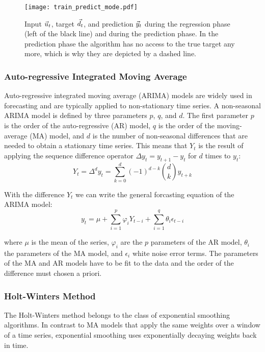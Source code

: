 \begin{figure}
  \centering
  \texttt{[image: train\_predict\_mode.pdf]}
  \caption{Input $\vec{u}_t$, target $\vec{d}_t$, and prediction $\vec{y}_t$ during the
  regression phase (left of the black line) and during the prediction phase.
  In the prediction phase the algorithm has no access to the true target
  any more, which is why they are depicted by a dashed line.}
  \label{fig:train_predict_mode}
\end{figure}

\subsubsection{Auto-regressive Integrated Moving Average}
\label{sub:arma}

Auto-regressive integrated moving average (ARIMA) models are widely used in
forecasting and are typically applied to non-stationary time series.  A
non-seasonal ARIMA model is defined by three parameters $p$, $q$, and $d$.  The
first parameter $p$ is the order of the auto-regressive (AR) model, $q$ is the
order of the moving-average (MA) model, and $d$ is the number of non-seasonal
differences that are needed to obtain a stationary time series.  This means
that $Y_t$ is the result of applying the sequence difference operator $\Delta
y_t = y_{t+1}-y_{t}$ for $d$ times to $y_t$:
\begin{equation}
  Y_t = \Delta^d y_t = \sum_{k=0}^d (-1)^{d-k} \binom{d}{k} y_{t+k}
\end{equation}

With the difference $Y_t$ we can write the general forcasting equation of the
ARIMA model:
\begin{equation}
  y_t = \mu + \sum_{i=1}^p \varphi_i Y_{t-i} + \sum_{i=1}^q \theta_i \epsilon_{t-i}
\end{equation}

where $\mu$ is the mean of the series, $\varphi_i$ are the $p$ parameters of
the AR model, $\theta_i$ the parameters of the MA model, and $\epsilon_i$ white
noise error terms.  The parameters of the MA and AR models have to be fit to
the data and the order of the difference must chosen a priori.


\subsubsection{Holt-Winters Method}
\label{sub:holt_winters_method}

The Holt-Winters method belongs to the class of exponential smoothing
algorithms.  In contrast to MA models that apply the same weights over a window
of a time series, exponential smoothing uses exponentially decaying weights
back in time.

